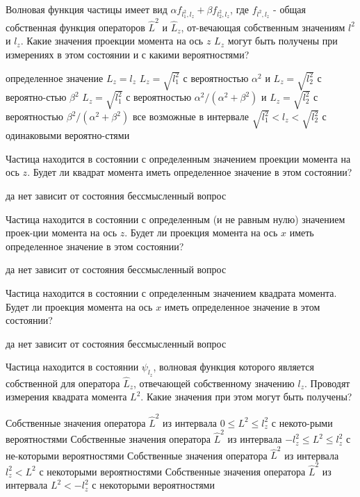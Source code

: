 \documentclass[11pt,a4paper]{exam}
\begin{document}
\begin{questions}
\question Волновая функция частицы имеет вид $\alpha {f_{l_1^2,{l_z}}} + \beta {f_{l_2^2,{l_z}}}$, где ${f_{{l^2},{l_z}}}$ - общая собственная функция операторов ${\hat L^2}$ и ${\hat L_z}$, от-вечающая собственным значениям ${l^2}$ и ${l_z}$. Какие значения проекции момента на ось $z$ ${L_z}$ могут быть получены при измерениях в этом состоянии и с какими вероятностями?
\begin{choices}
\choice определенное значение ${L_z} = {l_z}$
\choice ${L_z} = \sqrt {l_1^2} $ с вероятностью ${\alpha ^2}$ и ${L_z} = \sqrt {l_2^2} $ с вероятно-стью ${\beta ^2}$
\choice ${L_z} = \sqrt {l_1^2} $ с вероятностью ${\alpha ^2}/({\alpha ^2} + {\beta ^2})$ и ${L_z} = \sqrt {l_2^2} $ с вероятностью ${\beta ^2}/({\alpha ^2} + {\beta ^2})$
\choice все возможные в интервале $\sqrt {l_1^2}  < {l_z} < \sqrt {l_2^2} $ с одинаковыми вероятно-стями
\end{choices}

\question Частица находится в состоянии с определенным значением проекции момента на ось $z$. Будет ли квадрат момента иметь определенное значение в этом состоянии?
\begin{choices}
\choice да    
\choice нет      
\choice зависит от состояния       
\choice бессмысленный вопрос
\end{choices}

\question Частица находится в состоянии с определенным (и не равным нулю) значением проек-ции момента на ось $z$. Будет ли проекция момента на ось $x$ иметь определенное значение в этом состоянии?
\begin{choices}
\choice да             
\choice нет
\choice зависит от состояния       
\choice бессмысленный вопрос
\end{choices}

\question Частица находится в состоянии с определенным значением квадрата момента. Будет ли проекция момента на ось $x$ иметь определенное значение в этом состоянии?
\begin{choices}
\choice да             
\choice нет
\choice зависит от состояния    
\choice бессмысленный вопрос
\end{choices}

\question Частица находится в состоянии ${\psi _{{l_z}}}$, волновая функция которого является собственной для оператора ${\hat L_z}$, отвечающей собственному значению ${l_z}$. Проводят измерения квадрата момента ${L^2}$. Какие значения при этом могут быть получены?
\begin{choices}
\choice Собственные значения оператора ${\hat L^2}$ из интервала $0 \le {L^2} \le l_z^2$ с некото-рыми вероятностями
\choice Собственные значения оператора ${\hat L^2}$ из интервала $ - l_z^2 \le {L^2} \le l_z^2$ с не-которыми вероятностями
\choice Собственные значения оператора ${\hat L^2}$ из интервала $l_z^2 < {L^2}$ с некоторыми вероятностями 
\choice Собственные значения оператора ${\hat L^2}$ из интервала ${L^2} <  - l_z^2$ с некоторыми вероятностями 
\end{choices}


\end{questions}
\end{document}
